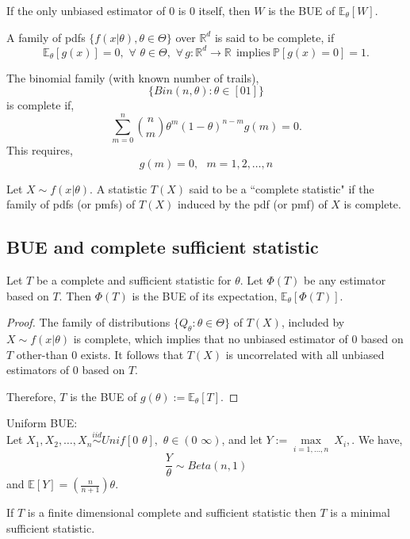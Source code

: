 \documentclass[a4paper,english,12pt]{article}
\begin{document}
\begin{cor} 
If the only unbiased estimator of $0$ is $0$ itself, then $W$ is the BUE of $\mathbb{E}_\theta[W]$.
\end{cor}
\begin{defn}
A family of pdfs $\{f(x|\theta),\theta \in \Theta \}$ over $\mathbb{R}^d$ is said to be complete, if
\begin{equation*}
\mathbb{E}_\theta[g(x)]=0, \,\, \forall\,\, \theta\in \Theta, \,\, \forall\, g: \mathbb{R}^d\rightarrow \mathbb{R}~~\mbox{implies}~\mathbb{P}[g(x)=0]=1.
\end{equation*}
\end{defn}
\begin{exmp}
The binomial family (with known number of trails),
\begin{equation*}
\{Bin(n,\theta): \theta\in[0 1]\}
\end{equation*}
is complete if, 
\begin{equation*}
\sum \limits_{m=0}^n {n \choose m}\theta^m(1-\theta)^{n-m} g(m)=0.
\end{equation*}
This requires, $$g(m)=0,\,\,\,\, m=1,2,\dots,n$$
\end{exmp}
\begin{defn}
Let $X \sim f(x|\theta)$. A statistic $T(X)$ said to be a ``complete statistic" if the family of pdfs (or pmfs) of $T(X)$ induced by the pdf (or pmf) of $X$ is complete. 
\end{defn}
\subsection{BUE and complete sufficient statistic}
\begin{thm}
Let $T$ be a complete and sufficient statistic for $\theta$. Let $\Phi(T)$ be any estimator based on $T$. Then $\Phi(T)$ is the BUE of its expectation, $\mathbb{E}_\theta[\Phi(T)]$.
\end{thm}
\begin{proof}
The family of distributions $ \{ Q_ \theta: \theta \in \Theta \}$ of $T(X)$, included by $X \sim f(x| \theta)$ is complete, which implies that no unbiased estimator of $0$ based on $T$ other-than $0$ exists. It follows that $T(X)$ is uncorrelated with all unbiased estimators of $0$ based on $T$. \par Therefore, $T$ is the BUE of $g(\theta):=\mathbb{E}_\theta[T]$. 
\end{proof}
\begin{exmp} Uniform BUE:\\
Let $X_1,X_2,\dots,X_n \overset{iid}{\sim} Unif[0 \,\,\theta], \,\, \theta\in(0\,\, \infty)$, and let $Y:=\underset{i=1,\dots,n}{\max}~X_i, $. We have,
\begin{equation}
\frac{Y}{\theta} \sim Beta(n,1)
\end{equation}
and 
$\mathbb{E}[Y]=(\frac{n}{n+1}) \theta $.
\end{exmp}
\begin{rem}
If $T$ is a finite dimensional complete and sufficient statistic then $T$ is a minimal sufficient statistic. 
\end{rem}
\end{document}

